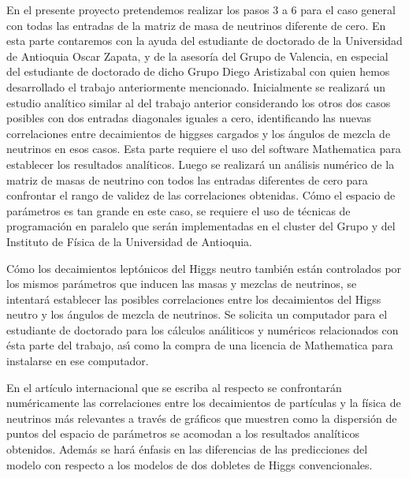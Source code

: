 \begin{ideas}
En el presente proyecto pretendemos realizar los pasos 3 a 6 para el
caso general con todas las entradas de la matriz de masa de neutrinos
diferente de cero. En esta parte contaremos con la ayuda del
estudiante de doctorado de la Universidad de Antioquia Oscar Zapata, y
de la asesoría del Grupo de Valencia, en especial del estudiante de
doctorado de dicho Grupo Diego Aristizabal con quien hemos
desarrollado el trabajo anteriormente mencionado.  Inicialmente se
realizará un estudio analítico similar al del trabajo anterior
considerando los otros dos casos posibles con dos entradas diagonales
iguales a cero, identificando las nuevas correlaciones entre
decaimientos de higgses cargados y los ángulos de mezcla de neutrinos
en esos casos. Esta parte requiere el uso del software Mathematica
para establecer los resultados analíticos.  Luego se realizará un
análisis numérico de la matriz de masas de neutrino con todos las
entradas diferentes de cero para confrontar el rango de validez de las
correlaciones obtenidas. Cómo el espacio de parámetros es tan grande
en este caso, se requiere el uso de técnicas de programación en
paralelo que serán implementadas en el cluster del Grupo y del
Instituto de Física de la Universidad de Antioquia.

Cómo los decaimientos leptónicos del Higgs neutro también están
controlados por los mismos parámetros que inducen las masas y mezclas
de neutrinos, se intentará establecer las posibles correlaciones entre
los decaimientos del Higss neutro y los ángulos de mezcla de
neutrinos. Se solicita un computador para el estudiante de doctorado
para los cálculos análiticos y numéricos relacionados con ésta parte
del trabajo, as\'\i{} como la compra de una licencia de Mathematica para
instalarse en ese computador.

En el artículo internacional que se escriba al respecto se
confrontarán numéricamente las correlaciones entre los decaimientos de
partículas y la física de neutrinos más relevantes a través de
gráficos que muestren como la dispersión de puntos del espacio de
parámetros se acomodan a los resultados analíticos obtenidos. Además
se hará énfasis en las diferencias de las predicciones del modelo con
respecto a los modelos de dos dobletes de Higgs convencionales. 



\end{ideas}
